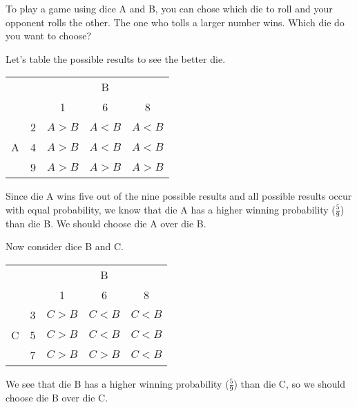 To play a game using dice A and B, you can chose which die to roll and your
opponent rolls the other. The one who tolls a larger number wins. Which die do
you want to choose?

Let's table the possible results to see the better die.
\begin{center}
  \begin{tabular}{cc|ccc}\hline
    &   & \multicolumn{3}{c}{B} \\
    &   & 1                & 6                & 8                \\ \hline
    \multirow{3}{*}{A}
    & 2 & \color{red}$A>B$ & $A<B$            & $A<B$            \\
    & 4 & \color{red}$A>B$ & $A<B$            & $A<B$            \\
    & 9 & \color{red}$A>B$ & \color{red}$A>B$ & \color{red}$A>B$ \\\hline
  \end{tabular}
\end{center}

Since die A wins five out of the nine possible results and all possible results
occur with equal probability, we know that die A has a higher winning
probability ($\frac{5}{9}$) than die B. We should choose die A over die B.

Now consider dice B and C.
\begin{center}
  \begin{tabular}{cc|ccc}\hline
    &   & \multicolumn{3}{c}{B} \\
    &   & 1                & 6                & 8                \\ \hline
    \multirow{3}{*}{C}
    & 3 & \color{red}$C>B$ & $C<B$            & $C<B$            \\
    & 5 & \color{red}$C>B$ & $C<B$            & $C<B$            \\
    & 7 & \color{red}$C>B$ & \color{red}$C>B$ & $C<B$ \\\hline
  \end{tabular}
\end{center}

We see that die B has a higher winning probability ($\frac{5}{9}$) than die C,
so we should choose die B over die C.

